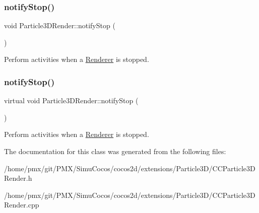 \subsubsection{\texorpdfstring{notify\+Stop()}{notifyStop()}\hspace{0.1cm}{\footnotesize\ttfamily [1/2]}}
{\footnotesize\ttfamily void Particle3\+D\+Render\+::notify\+Stop (\begin{DoxyParamCaption}{ }\end{DoxyParamCaption})\hspace{0.3cm}{\ttfamily [virtual]}}

Perform activities when a \hyperlink{classRenderer}{Renderer} is stopped. \mbox{\label{classParticle3DRender_a6628567a7c0f610931af8b83b4de18ca}} 
\subsubsection{\texorpdfstring{notify\+Stop()}{notifyStop()}\hspace{0.1cm}{\footnotesize\ttfamily [2/2]}}
{\footnotesize\ttfamily virtual void Particle3\+D\+Render\+::notify\+Stop (\begin{DoxyParamCaption}{ }\end{DoxyParamCaption})\hspace{0.3cm}{\ttfamily [virtual]}}

Perform activities when a \hyperlink{classRenderer}{Renderer} is stopped. 

The documentation for this class was generated from the following files\+:\begin{DoxyCompactItemize}
\item 
/home/pmx/git/\+P\+M\+X/\+Simu\+Cocos/cocos2d/extensions/\+Particle3\+D/C\+C\+Particle3\+D\+Render.\+h\item 
/home/pmx/git/\+P\+M\+X/\+Simu\+Cocos/cocos2d/extensions/\+Particle3\+D/C\+C\+Particle3\+D\+Render.\+cpp\end{DoxyCompactItemize}
